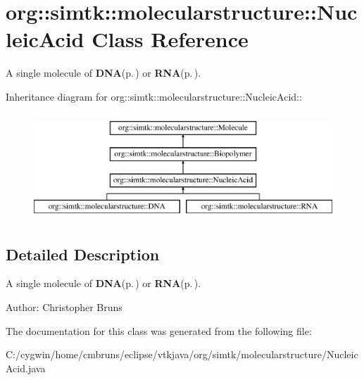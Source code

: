 \section{org::simtk::molecularstructure::Nucleic\-Acid Class Reference}
\label{classorg_1_1simtk_1_1molecularstructure_1_1_nucleic_acid}
A single molecule of {\bf DNA}{\rm (p.\,\pageref{classorg_1_1simtk_1_1molecularstructure_1_1_d_n_a})} or {\bf RNA}{\rm (p.\,\pageref{classorg_1_1simtk_1_1molecularstructure_1_1_r_n_a})}.  


Inheritance diagram for org::simtk::molecularstructure::Nucleic\-Acid::\begin{figure}[H]
\begin{center}
\leavevmode
\includegraphics[height=4cm]{classorg_1_1simtk_1_1molecularstructure_1_1_nucleic_acid}
\end{center}
\end{figure}


\subsection{Detailed Description}
A single molecule of {\bf DNA}{\rm (p.\,\pageref{classorg_1_1simtk_1_1molecularstructure_1_1_d_n_a})} or {\bf RNA}{\rm (p.\,\pageref{classorg_1_1simtk_1_1molecularstructure_1_1_r_n_a})}. 

\begin{Desc}
\item[Author:]Christopher Bruns \end{Desc}




The documentation for this class was generated from the following file:\begin{CompactItemize}
\item 
C:/cygwin/home/cmbruns/eclipse/vtkjava/org/simtk/molecularstructure/Nucleic\-Acid.java\end{CompactItemize}
